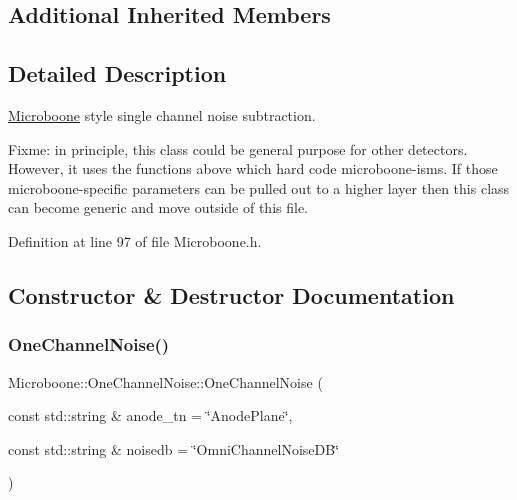 \subsection*{Additional Inherited Members}


\subsection{Detailed Description}
\hyperlink{namespace_wire_cell_1_1_sig_proc_1_1_microboone}{Microboone} style single channel noise subtraction.

Fixme\+: in principle, this class could be general purpose for other detectors. However, it uses the functions above which hard code microboone-\/isms. If those microboone-\/specific parameters can be pulled out to a higher layer then this class can become generic and move outside of this file. 

Definition at line 97 of file Microboone.\+h.



\subsection{Constructor \& Destructor Documentation}
\mbox{\label{class_wire_cell_1_1_sig_proc_1_1_microboone_1_1_one_channel_noise_aaf3c3c811f5520e23128fd8d9f1b970e}} 
\subsubsection{\texorpdfstring{One\+Channel\+Noise()}{OneChannelNoise()}}
{\footnotesize\ttfamily Microboone\+::\+One\+Channel\+Noise\+::\+One\+Channel\+Noise (\begin{DoxyParamCaption}\item[{const std\+::string \&}]{anode\+\_\+tn = {\ttfamily \char`\"{}AnodePlane\char`\"{}},  }\item[{const std\+::string \&}]{noisedb = {\ttfamily \char`\"{}OmniChannelNoiseDB\char`\"{}} }\end{DoxyParamCaption})}



